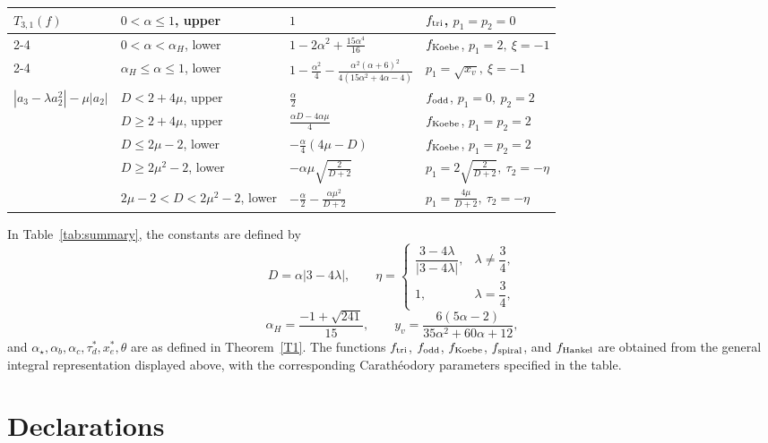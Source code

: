 \documentclass[11pt,reqno]{amsart}
\numberwithin{equation}{section}
\begin{document}
\begin{table}[htbp]
\begin{tabular}{|p{1.8cm}|p{3.2cm}|p{3.8cm}|p{4.4cm}|}
\hline
\multirow{3}{*}{\(T_{3,1}(f)\)}
& \(0<\alpha\le1\), upper & \(1\) & \(f_{\rm tri}\), \(p_1=p_2=0\) \\
\cline{2-4}
& \(0<\alpha<\alpha_H\), lower & \(\displaystyle1-2\alpha^2+\frac{15\alpha^4}{16}\) & \(f_{\rm Koebe}\), \(p_1=2,\ \xi=-1\) \\
\cline{2-4}
& \(\alpha_H\le\alpha\le1\), lower & \(\displaystyle1-\frac{\alpha^2}{4}-\frac{\alpha^2(\alpha+6)^2}{4(15\alpha^2+4\alpha-4)}\) & \(p_1=\sqrt{x_v},\ \xi=-1\) \\
\hline
\multirow{5}{*}{\(|a_3-\lambda a_2^2|-\mu|a_2|\)}
& \(D<2+4\mu\), upper & \(\displaystyle\frac{\alpha}{2}\) & \(f_{\rm odd}\), \(p_1=0,\ p_2=2\) \\
\cline{2-4}
& \(D\ge2+4\mu\), upper & \(\displaystyle\frac{\alpha D-4\alpha\mu}{4}\) & \(f_{\rm Koebe}\), \(p_1=p_2=2\) \\
\cline{2-4}
& \(D\le2\mu-2\), lower & \(\displaystyle-\frac{\alpha}{4}(4\mu-D)\) & \(f_{\rm Koebe}\), \(p_1=p_2=2\) \\
\cline{2-4}
& \(D\ge2\mu^2-2\), lower & \(\displaystyle-\alpha\mu\sqrt{\frac{2}{D+2}}\) & \(p_1=2\sqrt{\frac{2}{D+2}},\ \tau_2=-\eta\) \\
\cline{2-4}
& \(2\mu-2<D<2\mu^2-2\), lower & \(\displaystyle-\frac{\alpha}{2}-\frac{\alpha\mu^2}{D+2}\) & \(p_1=\frac{4\mu}{D+2},\ \tau_2=-\eta\) \\
\hline
\end{tabular}
\end{table}

\smallskip
\noindent
In Table~\ref{tab:summary}, the constants are defined by
\[
D=\alpha|3-4\lambda|,
\qquad
\eta=
\begin{cases}
\dfrac{3-4\lambda}{|3-4\lambda|}, & \lambda\neq\dfrac34,\\[8pt]
1, & \lambda=\dfrac34,
\end{cases}
\]
\[
\alpha_H=\frac{-1+\sqrt{241}}{15},
\qquad
y_v=\frac{6(5\alpha-2)}{35\alpha^2+60\alpha+12},
\]
and \(\alpha_\star,\alpha_b,\alpha_c,\tau_d^*,x_e^*,\theta\) are as defined in Theorem~\ref{T1}. The functions \(f_{\rm tri}\), \(f_{\rm odd}\), \(f_{\rm Koebe}\), \(f_{\rm spiral}\), and \(f_{\rm Hankel}\) are obtained from the general integral representation displayed above, with the corresponding Carath\'eodory parameters specified in the table.

\section*{Declarations}
\end{document}
